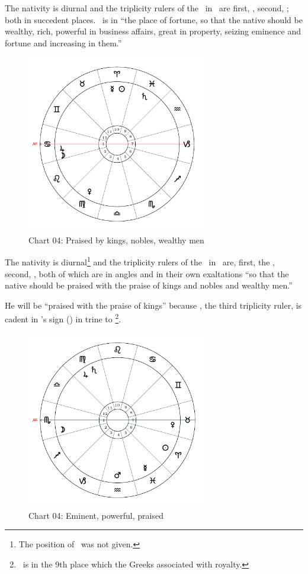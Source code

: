The nativity is diurnal and the triplicity rulers of the \Sun\, in \Aquarius\, are first, \Saturn, second, \Mercury; both in succedent places. \Mercury\, is in ``the place of fortune, so that the native should be wealthy, rich, powerful in business affairs, great in property, seizing eminence and fortune and increasing in them.''

\newpage
\begin{figure}[H]
\centering
\includegraphics[width=0.7\textwidth]{charts/1_24_03}
\vspace{-1em}
\caption{Chart 04: Praised by kings, nobles, wealthy men}
\end{figure}

The nativity is diurnal\footnote{The position of \Mars\, was not given.} and the triplicity rulers of the \Sun\, in \Aries\, are, first, the \Sun, second, \Jupiter, both of which are in angles and in their own exaltations ``so that the native should be praised with the praise of kings and nobles and wealthy men.''

He will be ``praised with the praise of kings'' because \Saturn, the third triplicity ruler, is cadent in \Jupiter's sign (\Pisces) in trine to \Jupiter\footnote{\Saturn\, is in the 9th place which the Greeks associated with royalty.}.

\begin{figure}[H]
\centering
\includegraphics[width=0.7\textwidth]{charts/1_24_04}
\vspace{-1em}
\caption{Chart 04: Eminent, powerful, praised}
\end{figure}

